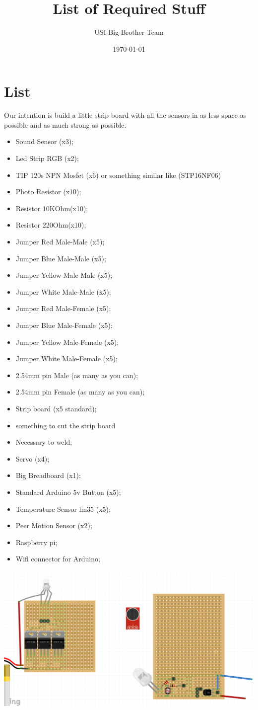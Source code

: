 \documentclass[12pt]{article}
\begin{document}
\title{List of Required Stuff}
\author{USI Big Brother Team}
\date{\today}
\maketitle
\section*{List}
Our intention is build a little strip board with all the sensors in as less space as possible and as much strong as possible.
\begin{itemize}
\item Sound Sensor (x3);
\item Led Strip RGB (x2);
\item TIP 120s NPN Mosfet (x6) or something similar like (STP16NF06)
\item Photo Resistor (x10);
\item Resistor 10KOhm(x10);
\item Resistor 220Ohm(x10);
\item Jumper Red Male-Male (x5);
\item Jumper Blue Male-Male (x5);
\item Jumper Yellow Male-Male (x5);
\item Jumper White Male-Male (x5);
\item Jumper Red Male-Female (x5);
\item Jumper Blue Male-Female (x5);
\item Jumper Yellow Male-Female (x5);
\item Jumper White Male-Female (x5);
\item 2.54mm pin Male (as many as you can);
\item 2.54mm pin Female (as many as you can);
\item Strip board (x5 standard);
\item something to cut the strip board
\item Necessary to weld;
\item Servo (x4);
\item Big Breadboard (x1);
\item Standard Arduino 5v Button (x5);
\item Temperature Sensor lm35 (x5);
\item Peer Motion Sensor (x2);
\item Raspberry pi;
\item Wifi connector for Arduino;

\end{itemize}
\includegraphics[scale=0.5]{stripBoard}
\end{document}
